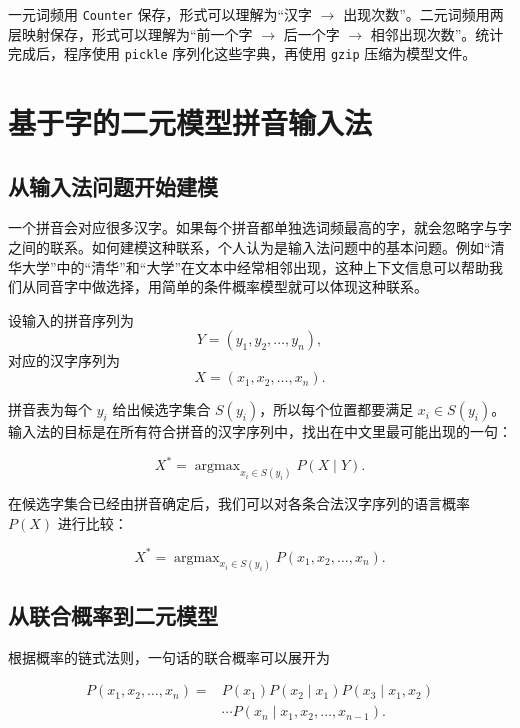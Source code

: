 \documentclass[11pt,a4paper]{ctexart}
\begin{document}
一元词频用 \texttt{Counter} 保存，形式可以理解为“汉字 $\rightarrow$ 出现次数”。二元词频用两层映射保存，形式可以理解为“前一个字 $\rightarrow$ 后一个字 $\rightarrow$ 相邻出现次数”。统计完成后，程序使用 \texttt{pickle} 序列化这些字典，再使用 \texttt{gzip} 压缩为模型文件。

\section{基于字的二元模型拼音输入法}

\subsection{从输入法问题开始建模}

一个拼音会对应很多汉字。如果每个拼音都单独选词频最高的字，就会忽略字与字之间的联系。如何建模这种联系，个人认为是输入法问题中的基本问题。例如“清华大学”中的“清华”和“大学”在文本中经常相邻出现，这种上下文信息可以帮助我们从同音字中做选择，用简单的条件概率模型就可以体现这种联系。

设输入的拼音序列为
\begin{equation}
Y=(y_1,y_2,\ldots,y_n),
\end{equation}
对应的汉字序列为
\begin{equation}
X=(x_1,x_2,\ldots,x_n).
\end{equation}

拼音表为每个 $y_i$ 给出候选字集合 $S(y_i)$，所以每个位置都要满足 $x_i\in S(y_i)$。输入法的目标是在所有符合拼音的汉字序列中，找出在中文里最可能出现的一句：

\begin{equation}
X^*=\mathop{\arg\max}_{x_i\in S(y_i)} P(X\mid Y).
\end{equation}

在候选字集合已经由拼音确定后，我们可以对各条合法汉字序列的语言概率 $P(X)$ 进行比较：

\begin{equation}
X^*=\mathop{\arg\max}_{x_i\in S(y_i)} P(x_1,x_2,\ldots,x_n).
\end{equation}

\subsection{从联合概率到二元模型}

根据概率的链式法则，一句话的联合概率可以展开为

\begin{equation}
\begin{aligned}
P(x_1,x_2,\ldots,x_n)
={}&P(x_1)P(x_2\mid x_1)P(x_3\mid x_1,x_2)\\
&\cdots P(x_n\mid x_1,x_2,\ldots,x_{n-1}).
\end{aligned}
\end{equation}
\end{document}
